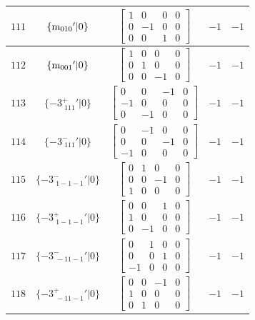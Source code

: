 \documentclass[fleqn,8pt]{jsarticle}
\begin{document}
\begin{longtable}{ccccc}
$ 111 $ & $ \{{\rm m}_{010}{}'|0\} $ & $ \begin{bmatrix} 1 & 0 & 0 & 0 \\ 0 & -1 & 0 & 0 \\ 0 & 0 & 1 & 0 \end{bmatrix} $ & $ -1 $ & $ -1 $ \\ \hline
$ 112 $ & $ \{{\rm m}_{001}{}'|0\} $ & $ \begin{bmatrix} 1 & 0 & 0 & 0 \\ 0 & 1 & 0 & 0 \\ 0 & 0 & -1 & 0 \end{bmatrix} $ & $ -1 $ & $ -1 $ \\ \hline
$ 113 $ & $ \{-3^{+}_{\,\,111}{}'|0\} $ & $ \begin{bmatrix} 0 & 0 & -1 & 0 \\ -1 & 0 & 0 & 0 \\ 0 & -1 & 0 & 0 \end{bmatrix} $ & $ -1 $ & $ -1 $ \\ \hline
$ 114 $ & $ \{-3^{-}_{\,\,111}{}'|0\} $ & $ \begin{bmatrix} 0 & -1 & 0 & 0 \\ 0 & 0 & -1 & 0 \\ -1 & 0 & 0 & 0 \end{bmatrix} $ & $ -1 $ & $ -1 $ \\ \hline
$ 115 $ & $ \{-3^{-}_{\,\,1-1-1}{}'|0\} $ & $ \begin{bmatrix} 0 & 1 & 0 & 0 \\ 0 & 0 & -1 & 0 \\ 1 & 0 & 0 & 0 \end{bmatrix} $ & $ -1 $ & $ -1 $ \\ \hline
$ 116 $ & $ \{-3^{+}_{\,\,1-1-1}{}'|0\} $ & $ \begin{bmatrix} 0 & 0 & 1 & 0 \\ 1 & 0 & 0 & 0 \\ 0 & -1 & 0 & 0 \end{bmatrix} $ & $ -1 $ & $ -1 $ \\ \hline
$ 117 $ & $ \{-3^{-}_{\,\,-11-1}{}'|0\} $ & $ \begin{bmatrix} 0 & 1 & 0 & 0 \\ 0 & 0 & 1 & 0 \\ -1 & 0 & 0 & 0 \end{bmatrix} $ & $ -1 $ & $ -1 $ \\ \hline
$ 118 $ & $ \{-3^{+}_{\,\,-11-1}{}'|0\} $ & $ \begin{bmatrix} 0 & 0 & -1 & 0 \\ 1 & 0 & 0 & 0 \\ 0 & 1 & 0 & 0 \end{bmatrix} $ & $ -1 $ & $ -1 $ \\ \hline

\end{longtable}
\end{document}
